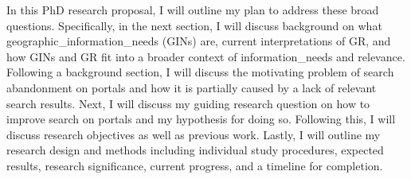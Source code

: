 In this PhD research proposal, I will outline my plan to address these broad questions. Specifically, in the next section, I will discuss background on what \gls{geographic_information_needs} (\acrshort{GIN}s) are, current interpretations of GR, and how GINs and GR fit into a broader context of \gls{information_need}s and relevance. Following a background section, I will discuss the motivating problem of search abandonment on portals and how it is partially caused by a lack of relevant search results. Next, I will discuss my guiding research question on how to improve search on portals and my hypothesis for doing so. Following this, I will discuss research objectives as well as previous work. Lastly, I will outline my research design and methods including individual study procedures, expected results, research significance, current progress, and a timeline for completion.

